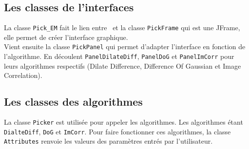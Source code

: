 \subsection{Les classes de l'interfaces}

La classe \texttt{Pick\_EM} fait le lien entre \imj ~et la classe \texttt{PickFrame} qui est une JFrame, elle permet de créer l'interface graphique.\\
Vient ensuite la classe \texttt{PickPanel} qui permet d'adapter l'interface en fonction de l'algorithme. En découlent \texttt{PanelDilateDiff}, \texttt{PanelDoG} et \texttt{PanelImCorr} pour leurs algorithmes respectifs (Dilate Difference, Difference Of Gaussian et Image Correlation).

\subsection{Les classes des algorithmes}

La classe \texttt{Picker} est utilisée pour appeler les algorithmes. Les algorithmes étant \texttt{DialteDiff}, \texttt{DoG} et \texttt{ImCorr}.
Pour faire fonctionner ces algorithmes, la classe \texttt{Attributes} renvoie les valeurs des paramètres entrés par l'utilisateur.
